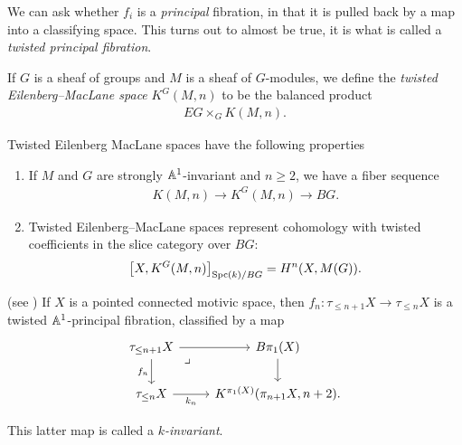 \documentclass[11pt,openany]{book}
\begin{document}
We can ask whether $f_i$ is a \textit{principal} fibration, in that it is pulled back by a map into a classifying space. This turns out to almost be true, it is what is called a \textit{twisted principal fibration}.

\begin{definition} \cite[B.2]{Morel}
If $G$ is a sheaf of groups and $M$ is a sheaf of $G$-modules, we define the \textit{twisted Eilenberg--MacLane space} $K^G(M,n)$ to be the balanced product
\begin{align*}
    EG \times_G K(M,n).
\end{align*}
\end{definition}

\begin{proposition} Twisted Eilenberg MacLane spaces have the following properties
\begin{enumerate}
    \item If $M$ and $G$ are strongly $\mathbb{A}^1$-invariant and $n\ge 2$, we have a fiber sequence \cite[4.17]{ABH-nilpotent}
    \begin{align*}
        K(M,n) \to K^G(M,n) \to BG.
    \end{align*}
    
    \item Twisted Eilenberg--MacLane spaces represent cohomology with twisted coefficients in the slice category over $BG$:
    \begin{align*}
        \left[ X, K^G(M,n) \right]_{\mathrm{Spc}(k)/BG} = H^n(X,M(G)).
    \end{align*}
\end{enumerate}
\end{proposition}


\begin{proposition} (see \cite[6.1]{AF3}) If $X$ is a pointed connected motivic space, then $f_n \colon \tau_{\le n+1} X \to \tau_{\le n} X$ is a twisted $\mathbb{A}^1$-principal fibration, classified by a map
\[\begin{tikzcd}
    \tau_{\le n+1}X\rar\dar["f_n" left]\pb & B\pi_1(X)\dar\\
    \tau_{\le n} X\rar["k_n" below] & {K^{\pi_1(X)}(\pi_{n+1}X, n+2)}.
\end{tikzcd} \]
\end{proposition}
This latter map is called a $k$\textit{-invariant}.
\end{document}
